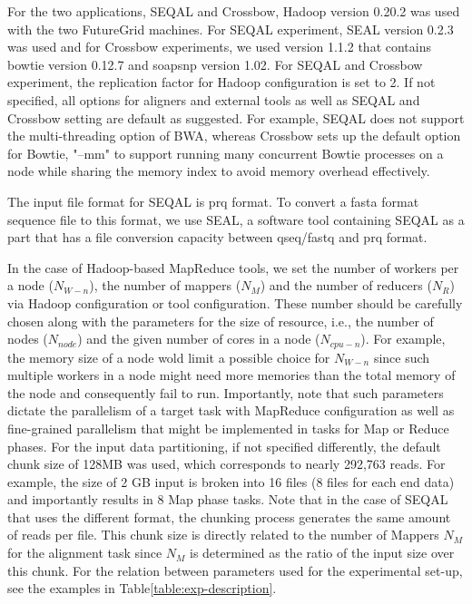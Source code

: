 \documentclass{sig-alternate}
\begin{document}
For the two applications, SEQAL and Crossbow, Hadoop version 0.20.2 was used with the two FutureGrid machines.  For SEQAL experiment, SEAL version 0.2.3 was used and for Crossbow experiments, we used version 1.1.2 that contains bowtie version 0.12.7 and soapsnp version 1.02.  For SEQAL and Crossbow experiment, the replication factor for Hadoop configuration is set  to 2.  If not specified, all options for aligners and external tools as well as SEQAL and Crossbow setting are default as suggested.  For example, SEQAL does not support the multi-threading option of BWA, whereas Crossbow sets up the default option for Bowtie, "--mm" to support running many concurrent Bowtie processes on a node while sharing the memory index to avoid memory overhead effectively.  

The input file format for SEQAL is prq format.  To convert a fasta format sequence file to this format, we use SEAL, a software tool containing SEQAL as a part that has a file conversion capacity between qseq/fastq and prq format.  

In the case of Hadoop-based MapReduce tools, we set the number of workers per a node ($N_{W-n}$), the number of mappers ($N_M$) and the number of reducers ($N_R$) via Hadoop configuration or tool configuration.  These number should be carefully chosen along with the parameters for the size of resource, i.e., the number of nodes ($N_{node}$) and the given number of cores in a node ($N_{cpu-n}$).  For example, the memory size of a node wold limit a possible choice for $N_{W-n}$ since such multiple workers in a node might need more memories than the total memory of the node and consequently fail to run.  Importantly, note that such parameters dictate the parallelism of a target task with MapReduce configuration as well as fine-grained parallelism that might be implemented in tasks for Map or Reduce phases.  For the input data partitioning, if not specified differently, the default chunk size of 128MB was used, which corresponds to nearly 292,763 reads.  For example, the size of 2 GB input is broken into 16 files (8 files for each end data) and importantly results in 8 Map phase tasks.  Note that in the case of SEQAL that uses the different format, the chunking process generates the same amount of reads per file.  This chunk size is directly related to the number of Mappers $N_M$ for the alignment task since  $N_M$ is determined as the ratio of the input size over this chunk.   For the relation between parameters used for the experimental set-up, see the examples in Table\ref{table:exp-description}. 
%
\end{document}
